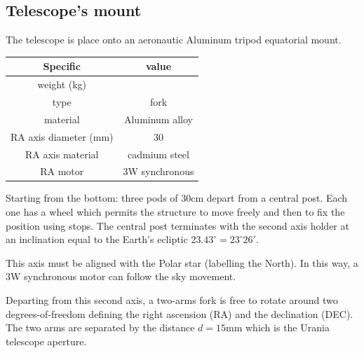 \documentclass{article}
\begin{document}
\begin{multicols}{2}
        \subsection{Telescope's mount}
        The telescope is place onto an aeronautic Aluminum tripod equatorial mount.
        \\
        \begin{minipage}{.4\textwidth}
            \begin{tabular}{cc}
                Specific & value \\
                \hline
                weight (kg) & \\
                type & fork \\
                material & Aluminum alloy \\
                RA axis diameter (mm) & 30 \\
                RA axis material & cadmium steel \\
                RA motor & 3W synchronous \\
                \hline
            \end{tabular}
            \label{tab:mount}
        \end{minipage}

        Starting from the bottom: three pods of 30cm depart from a central post. Each one has a wheel which permits the structure to move freely and then to fix the position using stops.
        The central post terminates with the second axis holder at an inclination equal to the Earth's ecliptic \(23.43^{\circ} = 23^{\circ} 26'\).

        This axis must be aligned with the Polar star (labelling the North).
        In this way, a 3W synchronous motor can follow the sky movement.

        Departing from this second axis, a two-arms fork is free to rotate around two degrees-of-freedom defining the right ascension (RA) and the declination (DEC).
        The two arms are separated by the distance \(d = 15\)mm which is the Urania telescope aperture.

\end{multicols}
\end{document}
